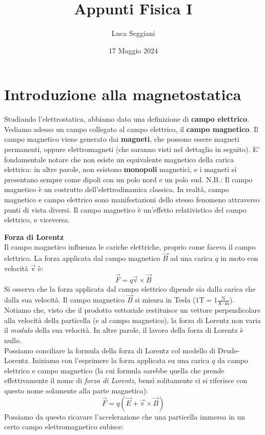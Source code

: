 \documentclass[a4paper,12pt]{article}
\title{Appunti Fisica I}
\author{Luca Seggiani}
\date{17 Maggio 2024}
\begin{document}
\maketitle
\section{Introduzione alla magnetostatica}
Studiando l'elettrostatica, abbiamo dato una definizione di \textbf{campo elettrico}. Vediamo adesso un campo
collegato al campo elettrico, il \textbf{campo magnetico}. Il campo magnetico viene generato dai \textbf{magneti},
che possono essere magneti permanenti, oppure elettromagneti (che saranno visti nel dettaglio in seguito). 
E' fondamentale notare che non esiste un equivalente magnetico della carica elettrica: in altre parole, 
non esistono \textbf{monopoli} magnetici, e i magneti si presentano sempre come dipoli con un polo nord e un polo sud.
N.B.: Il campo magnetico è un costrutto dell'elettrodinamica classica. In realtà, campo magnetico e campo elettrico
sono manifestazioni dello stesso fenomeno attraverso punti di vista diversi. Il campo magnetico è un'effetto relativistico
del campo elettrico, e viceversa.
\par\smallskip
\textbf{Forza di Lorentz} \\
Il campo magnetico influenza le cariche elettriche, proprio come faceva il campo elettrico. La forza applicata dal
campo magnetico $\vec{B}$ ad una carica $q$ in moto con velocità $\vec{\mathrm{v}}$ è:
$$ \vec{F} = q\vec{\mathrm{v}} \times \vec{B}$$
Si osserva che la forza applicata dal campo elettrico dipende sia dalla carica che dalla sua velocità. Il campo magnetico
$\vec{B}$ si misura in Tesla ($1\mathrm{T} = 1\frac{\mathrm{N}}{\mathrm{A}\cdot\mathrm{m}}$). Notiamo che, visto
che il prodotto vettoriale restituisce un vettore perpendicolare alla velocità della particella (e al campo magnetico),
la forza di Lorentz non varia il \textit{modulo} della sua velocità. In altre parole, il lavoro della forza di Lorentz è nullo. \\
Possiamo conciliare la formula della forza di Lorentz col modello di Drude-Lorentz. Iniziamo con l'esprimere la forza
applicata su una carica $q$ da campo elettrico e campo magnetico (la cui formula sarebbe quella che prende effettivamente
il nome di \textit{forza di Lorentz}, bensì solitamente ci si riferisce con questo nome solamente alla parte magnetica):
$$ \vec{F} = q(\vec{E} + \vec{\mathrm{v}} \times \vec{B}) $$
Possiamo da questo ricavare l'accelerazione che una particella immersa in un certo campo elettromagnetico subisce:
\end{document}
